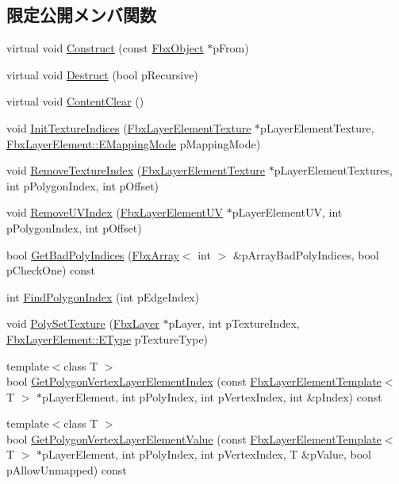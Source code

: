 \subsection*{限定公開メンバ関数}
\begin{DoxyCompactItemize}
\item 
virtual void \hyperlink{class_fbx_mesh_a230787ca87312437d427d9ec7c150565}{Construct} (const \hyperlink{class_fbx_object}{Fbx\+Object} $\ast$p\+From)
\item 
virtual void \hyperlink{class_fbx_mesh_a1755e89d515fadbc2d52924917b618f7}{Destruct} (bool p\+Recursive)
\item 
virtual void \hyperlink{class_fbx_mesh_aacd77ff7908d897c73983919c4aade72}{Content\+Clear} ()
\item 
void \hyperlink{class_fbx_mesh_a79732f5b5d10581887b78877cd67b003}{Init\+Texture\+Indices} (\hyperlink{class_fbx_layer_element_texture}{Fbx\+Layer\+Element\+Texture} $\ast$p\+Layer\+Element\+Texture, \hyperlink{class_fbx_layer_element_a5a40e95db30ae9f94611dc3f1568af26}{Fbx\+Layer\+Element\+::\+E\+Mapping\+Mode} p\+Mapping\+Mode)
\item 
void \hyperlink{class_fbx_mesh_a7ae53a8f960212268fbfa5d5a63333ee}{Remove\+Texture\+Index} (\hyperlink{class_fbx_layer_element_texture}{Fbx\+Layer\+Element\+Texture} $\ast$p\+Layer\+Element\+Textures, int p\+Polygon\+Index, int p\+Offset)
\item 
void \hyperlink{class_fbx_mesh_addc0a339c2d452b4a1d8d6a465aa9c62}{Remove\+U\+V\+Index} (\hyperlink{class_fbx_layer_element_u_v}{Fbx\+Layer\+Element\+UV} $\ast$p\+Layer\+Element\+UV, int p\+Polygon\+Index, int p\+Offset)
\item 
bool \hyperlink{class_fbx_mesh_ae2148a3e615dac499fbbbe57a714547e}{Get\+Bad\+Poly\+Indices} (\hyperlink{class_fbx_array}{Fbx\+Array}$<$ int $>$ \&p\+Array\+Bad\+Poly\+Indices, bool p\+Check\+One) const
\item 
int \hyperlink{class_fbx_mesh_adccc8b864012541903afb1df02654161}{Find\+Polygon\+Index} (int p\+Edge\+Index)
\item 
void \hyperlink{class_fbx_mesh_a9a333d725455805aa0fa2dae26a85929}{Poly\+Set\+Texture} (\hyperlink{class_fbx_layer}{Fbx\+Layer} $\ast$p\+Layer, int p\+Texture\+Index, \hyperlink{class_fbx_layer_element_a8c95c5cd880b56c776acd379bd86f42c}{Fbx\+Layer\+Element\+::\+E\+Type} p\+Texture\+Type)
\item 
{\footnotesize template$<$class T $>$ }\\bool \hyperlink{class_fbx_mesh_a68a6816acf0eaacc995144b14a28c856}{Get\+Polygon\+Vertex\+Layer\+Element\+Index} (const \hyperlink{class_fbx_layer_element_template}{Fbx\+Layer\+Element\+Template}$<$ T $>$ $\ast$p\+Layer\+Element, int p\+Poly\+Index, int p\+Vertex\+Index, int \&p\+Index) const
\item 
{\footnotesize template$<$class T $>$ }\\bool \hyperlink{class_fbx_mesh_aaa40241afa27d42fbacb6d78f00a947b}{Get\+Polygon\+Vertex\+Layer\+Element\+Value} (const \hyperlink{class_fbx_layer_element_template}{Fbx\+Layer\+Element\+Template}$<$ T $>$ $\ast$p\+Layer\+Element, int p\+Poly\+Index, int p\+Vertex\+Index, T \&p\+Value, bool p\+Allow\+Unmapped) const
\end{DoxyCompactItemize}
